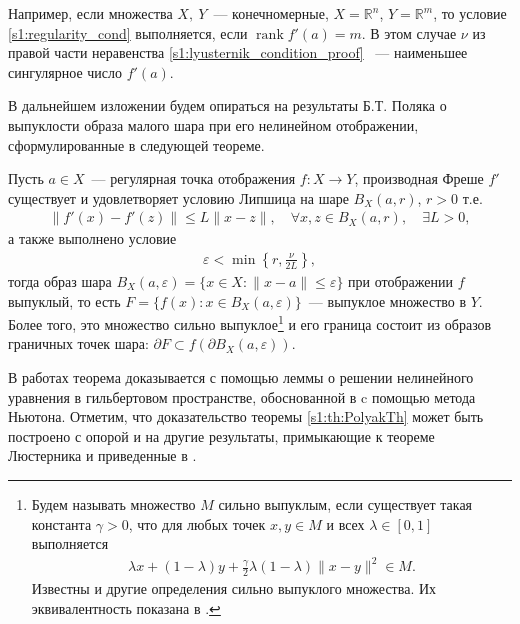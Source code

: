 \documentclass[../main.tex]{subfiles}
\begin{document}
Например, если множества $X,\ Y$~--- конечномерные, $X = \mathbb{R}^n$, $Y = \mathbb{R}^m$, то условие \eqref{s1:regularity_cond} выполняется, если  $ \operatorname{rank} f'(a) = m$.
В этом случае $\nu$ из правой части неравенства \eqref{s1:lyusternik_condition_proof} ~--- наименьшее сингулярное число $f'(a)$. 

В дальнейшем изложении будем опираться на результаты Б.Т. Поляка о выпуклости образа малого шара при его нелинейном отображении, сформулированные в следующей теореме. 
\begin{theorem}\label{s1:th:PolyakTh}
    Пусть $a \in X$~--- регулярная точка отображения $f: X \rightarrow Y$, производная Фреше $f'$ существует и удовлетворяет условию Липшица на шаре  $B_X(a,r) $, $r > 0$  т.е. 
    \begin{gather}\label{s1:lip_cond}
        \| f'(x) - f'(z) \| \leqslant L \| x - z \|, \quad \forall x,z \in B_X(a,r), \quad \exists L > 0,
    \end{gather}
    а также выполнено условие
    \begin{gather}
        \varepsilon < \min\left\{r,\frac{\nu}{2L}\right\},
    \end{gather}
    тогда образ шара $B_X(a,\varepsilon) = \{x \in X: \| x - a\| \leqslant \varepsilon\}$ при отображении $f$ выпуклый, то есть $F = \{f(x): x \in B_X(a,\varepsilon)\}$~--- выпуклое множество в $Y$.
    Более того, это множество сильно выпуклое\footnote
    {Будем называть множество $M $ сильно выпуклым, если существует такая константа $\gamma > 0$, что для любых точек $x, y \in M$ и всех $\lambda \in [0, 1]$ выполняется 
    \begin{gather*}
    	\lambda x + (1 - \lambda) y + \frac{\gamma}{2}\lambda (1 - \lambda) \| x - y \|^2 \in M.
    \end{gather*}
Известны и другие определения сильно выпуклого множества. Их эквивалентность показана в \cite{vial}.}
     и его граница состоит из образов граничных точек шара: $\partial F \subset f(\partial B_X(a,\varepsilon))$.
\end{theorem}
    
В работах \cite{Polyak2001, Polyak2001ru} теорема доказывается с помощью леммы о решении нелинейного уравнения в гильбертовом пространстве, обоснованной в \cite{Polyak1964} c помощью метода Ньютона.
Отметим, что доказательство теоремы \ref{s1:th:PolyakTh} может быть построено с опорой и на другие результаты, примыкающие к теореме Люстерника и приведенные в \cite{Dmitruk1980, Ioffe}.
    
\end{document}
